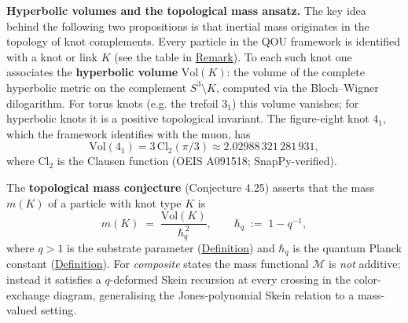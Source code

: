 \textbf{Hyperbolic volumes and the topological mass ansatz.}
The key idea behind the following two propositions is that inertial mass
originates in the topology of knot complements. Every particle in the QOU
framework is identified with a knot or link $K$ (see the table in
\hyperref[rem:skein-decomposition]{Remark}). To each such knot one associates the
\textbf{hyperbolic volume} $\mathrm{Vol}(K)$: the volume of the complete
hyperbolic metric on the complement $S^3 \setminus K$, computed via the
Bloch--Wigner dilogarithm. For torus knots (e.g. the trefoil $3_1$) this
volume vanishes; for hyperbolic knots it is a positive topological invariant.
The figure-eight knot $4_1$, which the framework identifies with the muon,
has
\[
\mathrm{Vol}(4_1) = 3\,\mathrm{Cl}_2(\pi/3)
    \approx 2.02988\,321\,281\,931,
\]
where $\mathrm{Cl}_2$ is the Clausen function (OEIS A091518; SnapPy-verified).

The \textbf{topological mass conjecture} (Conjecture 4.25) asserts that the
mass $m(K)$ of a particle with knot type $K$ is
\[
m(K) \;=\; \frac{\mathrm{Vol}(K)}{\hbar_q^{\,2}},
  \qquad
  \hbar_q \;:=\; 1 - q^{-1},
\]
where $q > 1$ is the substrate parameter
(\hyperref[def:substrate-parameter]{Definition}) and $\hbar_q$ is the quantum
Planck constant (\hyperref[def:quantum-planck-constant]{Definition}). For
\emph{composite} states the mass functional $\mathcal{M}$ is \emph{not}
additive; instead it satisfies a $q$-deformed Skein recursion at every
crossing in the color-exchange diagram, generalising the Jones-polynomial
Skein relation to a mass-valued setting.

